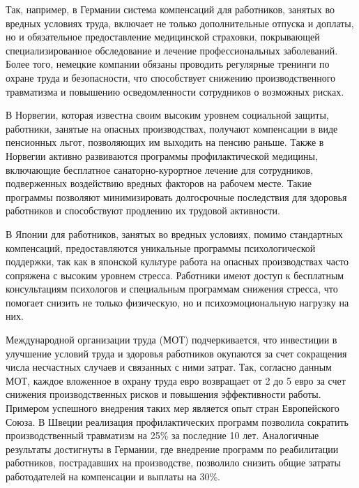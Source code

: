 \begin{multicols}{2}

Так, например, в Германии система компенсаций для работников, занятых во
вредных условиях труда, включает не только дополнительные отпуска и
доплаты, но и обязательное предоставление медицинской страховки,
покрывающей специализированное обследование и лечение профессиональных
заболеваний. Более того, немецкие компании обязаны проводить регулярные
тренинги по охране труда и безопасности, что способствует снижению
производственного травматизма и повышению осведомленности сотрудников о
возможных рисках.

В Норвегии, которая известна своим высоким уровнем социальной защиты,
работники, занятые на опасных производствах, получают компенсации в виде
пенсионных льгот, позволяющих им выходить на пенсию раньше. Также в
Норвегии активно развиваются программы профилактической медицины,
включающие бесплатное санаторно-курортное лечение для сотрудников,
подверженных воздействию вредных факторов на рабочем месте. Такие
программы позволяют минимизировать долгосрочные последствия для здоровья
работников и способствуют продлению их трудовой активности.

В Японии для работников, занятых во вредных условиях, помимо стандартных
компенсаций, предоставляются уникальные программы психологической
поддержки, так как в японской культуре работа на опасных производствах
часто сопряжена с высоким уровнем стресса. Работники имеют доступ к
бесплатным консультациям психологов и специальным программам снижения
стресса, что помогает снизить не только физическую, но и
психоэмоциональную нагрузку на них.

Международной организации труда (МОТ) подчеркивается, что инвестиции в
улучшение условий труда и здоровья работников окупаются за счет
сокращения числа несчастных случаев и связанных с ними затрат. Так,
согласно данным МОТ, каждое вложенное в охрану труда евро возвращает от
2 до 5 евро за счет снижения производственных рисков и повышения
эффективности работы\hspace{0pt}\hspace{0pt}. Примером успешного
внедрения таких мер является опыт стран Европейского Союза. В Швеции
реализация профилактических программ позволила сократить
производственный травматизм на 25\% за последние 10 лет. Аналогичные
результаты достигнуты в Германии, где внедрение программ по реабилитации
работников, пострадавших на производстве, позволило снизить общие
затраты работодателей на компенсации и выплаты на
30\%\hspace{0pt}\hspace{0pt}.


\end{multicols}
